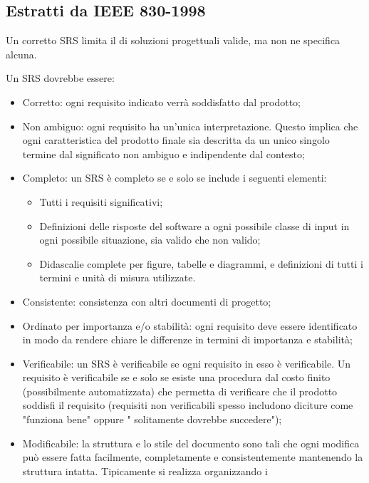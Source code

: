 \subsection{Estratti da IEEE 830-1998}
Un corretto SRS limita il  di soluzioni progettuali valide,
ma non ne specifica alcuna.

Un SRS dovrebbe essere:
\begin{itemize}
  \item Corretto: ogni requisito indicato verrà soddisfatto dal prodotto;
  \item Non ambiguo: ogni requisito ha un'unica interpretazione. Questo implica
        che ogni caratteristica del prodotto finale sia descritta da un unico
        singolo termine dal significato non ambiguo e indipendente dal contesto;
  \item Completo: un SRS è completo se e solo se include i seguenti elementi:
    \begin{itemize}
      \item Tutti i requisiti significativi;
      \item Definizioni delle risposte del software a ogni possibile classe di
            input in ogni possibile situazione, sia valido che non valido;
      \item Didascalie complete per figure, tabelle e diagrammi, e definizioni
      di tutti i termini e unità di misura utilizzate.
    \end{itemize}
  \item Consistente: consistenza con altri documenti di progetto;
  \item Ordinato per importanza e/o stabilità: ogni requisito deve essere
        identificato in modo da rendere chiare le differenze in termini di
        importanza e stabilità;
  \item Verificabile: un SRS è verificabile se ogni requisito in esso è
        verificabile. Un requisito è verificabile se e solo se esiste una
        procedura dal costo finito (possibilmente automatizzata) che permetta di
        verificare che il prodotto soddisfi il requisito (requisiti non
        verificabili spesso includono diciture come "funziona bene" oppure "
        solitamente dovrebbe succedere");
  \item Modificabile: la struttura e lo stile del documento sono tali che ogni
        modifica può essere fatta facilmente, completamente e consistentemente
        mantenendo la struttura intatta. Tipicamente si realizza organizzando i

\end{itemize}
